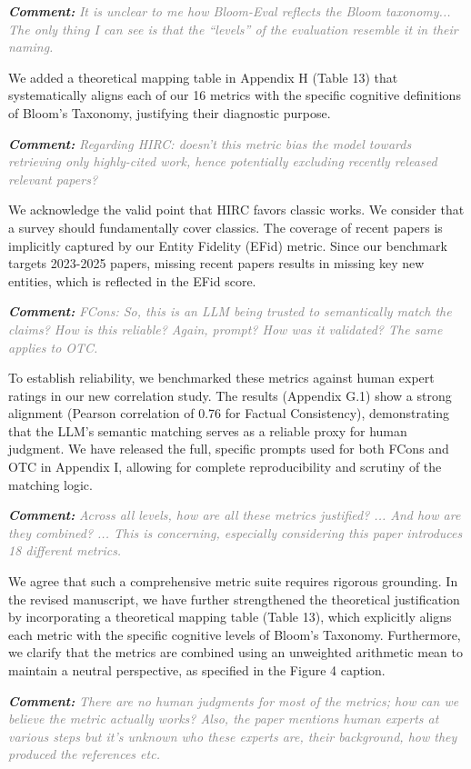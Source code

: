 \documentclass[11pt, a4paper]{article}
\newcommand{\comment}[1]{%
    \par\vspace{1em}%
    \noindent\textbf{\textit{Comment:}} \textit{\textcolor{gray}{#1}}%
}
\begin{document}
\comment{It is unclear to me how Bloom-Eval reflects the Bloom taxonomy... The only thing I can see is that the ``levels'' of the evaluation resemble it in their naming.}

We added a theoretical mapping table in Appendix H (Table 13) that systematically aligns each of our 16 metrics with the specific cognitive definitions of Bloom's Taxonomy, justifying their diagnostic purpose.

\comment{Regarding HIRC: doesn't this metric bias the model towards retrieving only highly-cited work, hence potentially excluding recently released relevant papers?}

We acknowledge the valid point that HIRC favors classic works. We consider that a survey should fundamentally cover classics. The coverage of recent papers is implicitly captured by our Entity Fidelity (EFid) metric. Since our benchmark targets 2023-2025 papers, missing recent papers results in missing key new entities, which is reflected in the EFid score.

\comment{FCons: So, this is an LLM being trusted to semantically match the claims? How is this reliable? Again, prompt? How was it validated? The same applies to OTC.}

To establish reliability, we benchmarked these metrics against human expert ratings in our new correlation study. The results (Appendix G.1) show a strong alignment (Pearson correlation of 0.76 for Factual Consistency), demonstrating that the LLM's semantic matching serves as a reliable proxy for human judgment. We have released the full, specific prompts used for both FCons and OTC in Appendix I, allowing for complete reproducibility and scrutiny of the matching logic.

\comment{Across all levels, how are all these metrics justified? ... And how are they combined? ... This is concerning, especially considering this paper introduces 18 different metrics.}

We agree that such a comprehensive metric suite requires rigorous grounding. In the revised manuscript, we have further strengthened the theoretical justification by incorporating a theoretical mapping table (Table 13), which explicitly aligns each metric with the specific cognitive levels of Bloom's Taxonomy. Furthermore, we clarify that the metrics are combined using an unweighted arithmetic mean to maintain a neutral perspective, as specified in the Figure 4 caption.


\comment{There are no human judgments for most of the metrics; how can we believe the metric actually works? Also, the paper mentions human experts at various steps but it's unknown who these experts are, their background, how they produced the references etc.}
\end{document}
